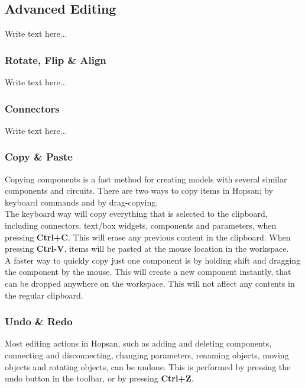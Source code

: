 
\subsection{Advanced Editing}
Write text here...

\subsubsection{Rotate, Flip \& Align}
Write text here...

\subsubsection{Connectors}
Write text here...

\subsubsection{Copy \& Paste}
Copying components is a fast method for creating models with several similar components and circuits. There are two ways to copy items in Hopsan; by keyboard commands and by drag-copying.\\

The keyboard way will copy everything that is selected to the clipboard, including connectors, text/box widgets, components and parameters, when pressing \textbf{Ctrl+C}. This will erase any previous content in the clipboard. When pressing \textbf{Ctrl-V}, items will be pasted at the mouse location in the workspace.\\

A faster way to quickly copy just one component is by holding shift and dragging the component by the mouse. This will create a new component instantly, that can be dropped anywhere on the workspace. This will not affect any contents in the regular clipboard.

\subsubsection{Undo \& Redo}
Most editing actions in Hopsan, such as adding and deleting components, connecting and disconnecting, changing parameters, renaming objects, moving objects and rotating objects, can be undone. This is performed by pressing the undo button in the toolbar, or by pressing \textbf{Ctrl+Z}.

